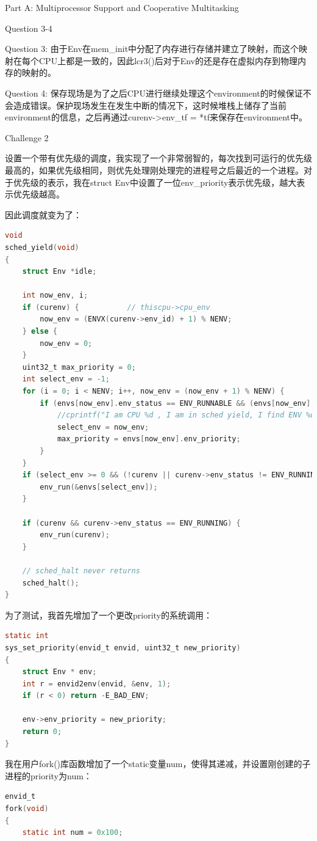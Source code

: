 \documentclass[GBK,winfonts,a4paper,10pt]{ctexart}
\begin{document}
\begin{section}{Part A: Multiprocessor Support and Cooperative Multitasking}
\begin{subsection}{Question 3-4}
\par
Question 3: 由于Env在mem\_init中分配了内存进行存储并建立了映射，而这个映射在每个CPU上都是一致的，因此lcr3()后对于Env的还是存在虚拟内存到物理内存的映射的。
\par
Question 4: 保存现场是为了之后CPU进行继续处理这个environment的时候保证不会造成错误。保护现场发生在发生中断的情况下，这时候堆栈上储存了当前environment的信息，之后再通过curenv->env\_tf = *tf来保存在environment中。
\end{subsection}

\begin{subsection}{Challenge 2}
\par
设置一个带有优先级的调度，我实现了一个非常弱智的，每次找到可运行的优先级最高的，如果优先级相同，则优先处理刚处理完的进程号之后最近的一个进程。对于优先级的表示，我在struct Env中设置了一位env\_priority表示优先级，越大表示优先级越高。
\par
因此调度就变为了：
\begin{lstlisting}[language=C]
void
sched_yield(void)
{
	struct Env *idle;

	int now_env, i;
	if (curenv) {			// thiscpu->cpu_env
		now_env = (ENVX(curenv->env_id) + 1) % NENV;
	} else {
		now_env = 0;
	}
	uint32_t max_priority = 0;
	int select_env = -1;
	for (i = 0; i < NENV; i++, now_env = (now_env + 1) % NENV) {
		if (envs[now_env].env_status == ENV_RUNNABLE && (envs[now_env].env_priority > max_priority || select_env == -1)) {
			//cprintf("I am CPU %d , I am in sched yield, I find ENV %d\n", thiscpu->cpu_id, now_env);
			select_env = now_env;
			max_priority = envs[now_env].env_priority;
		}
	}
	if (select_env >= 0 && (!curenv || curenv->env_status != ENV_RUNNING || max_priority >= curenv->env_priority)) {
		env_run(&envs[select_env]);
	}
	
	if (curenv && curenv->env_status == ENV_RUNNING) {
		env_run(curenv);
	}

	// sched_halt never returns
	sched_halt();
}
\end{lstlisting}
\par
为了测试，我首先增加了一个更改priority的系统调用：
\begin{lstlisting}[language=C]
static int
sys_set_priority(envid_t envid, uint32_t new_priority)
{
	struct Env * env;
	int r = envid2env(envid, &env, 1);	
	if (r < 0) return -E_BAD_ENV;
	
	env->env_priority = new_priority;
	return 0;
}
\end{lstlisting}
\par
我在用户fork()库函数增加了一个static变量num，使得其递减，并设置刚创建的子进程的priority为num：
\begin{lstlisting}[language=C]
envid_t
fork(void)
{
	static int num = 0x100;


\end{lstlisting}
\end{subsection}
\end{section}
\end{document}
